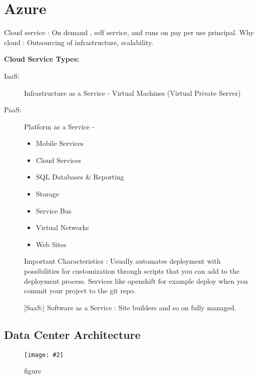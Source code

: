 \documentclass[a4paper,10pt]{scrreprt}
\newcommand{\pic}[2][figure]{\begin{figure}[h]
 \centering
 \texttt{[image: \#2]}
 \caption{#1}
\end{figure}
}
\begin{document}
\chapter{Azure}

Cloud service : On demand , self service, and runs on pay per use principal.
Why cloud : Outsourcing of infrastructure, scalability.

\textbf{Cloud Service Types:}

\begin{description}
\item [IaaS:] Infrastructure as a Service - Virtual Machines (Virtual Private Server)
\item [PaaS:] Platform as a Service - \begin{itemize}
                                 \item Mobile Services
\item Cloud Services
\item  SQL Databases \& Reporting
\item  Storage
\item Service Bus
\item  Virtual Networks
\item Web Sites
                                \end{itemize}
                                
Important Characteristics : Usually automates deployment with possibilities for customization through scripts that you 
can add to the deployment process. Services like openshift for example deploy when you commit your project to the git 
repo.

[SaaS:] Software as a Service : Site builders and so on fully managed.

\end{description}

\section{Data Center Architecture}
\pic{dca.png}
\end{document}
